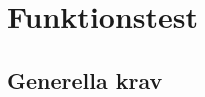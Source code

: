 \documentclass[a4paper]{article}
\begin{document}
\section{Funktionstest}


%
%
%

\subsection{Generella krav}
\end{document}
